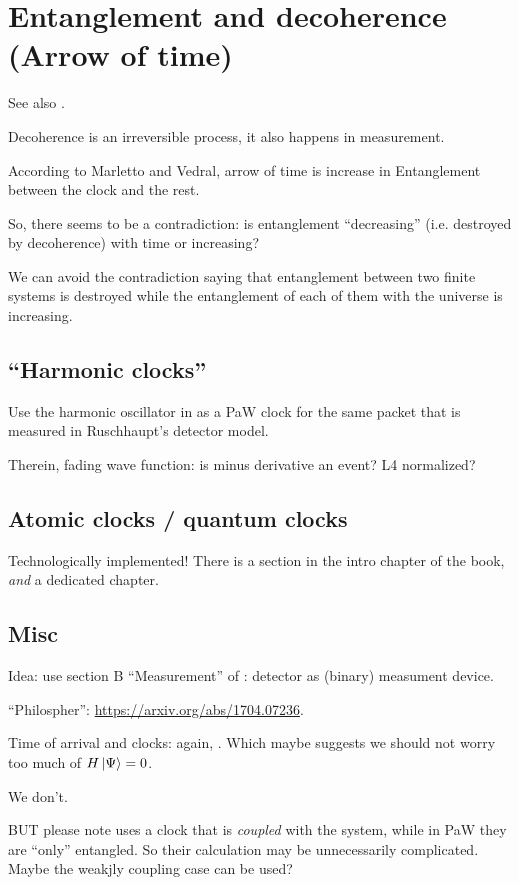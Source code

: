 \section{Entanglement and decoherence (Arrow of time)}
See also \cite{EntanglementVsDecoherence}.

Decoherence is an irreversible process, it also happens in measurement.

According to Marletto and Vedral, arrow of time is increase in Entanglement
between the clock and the rest.

So, there seems to be a contradiction: is entanglement ``decreasing''
(i.e. destroyed by decoherence) with time
or increasing?

We can avoid the contradiction saying that
entanglement between two finite systems is
destroyed while the entanglement of each of them with the universe
is increasing.

\subsection{``Harmonic clocks''}

Use the harmonic oscillator in \cite{HarmonicClocks}
as a PaW clock for the same packet that is measured in
Ruschhaupt's detector model.

Therein, fading wave function: is minus derivative an event?
L4 normalized?

\subsection{Atomic clocks / quantum clocks}
Technologically implemented! There is a section in the intro chapter of the book,
\emph{and} a dedicated chapter.

\subsection{Misc}

Idea: use section B ``Measurement'' of \cite{Lloyd:Time}: detector as (binary) measument device.

``Philospher'': \url{https://arxiv.org/abs/1704.07236}.

Time of arrival and clocks: again, \cite{YearsleyHalliwell_Clocks}.
Which maybe suggests we should not worry too much of $H\ket{\Psi} = 0$.

We don't.

BUT please note \cite{YearsleyHalliwell_Clocks} uses a clock that is
\emph{coupled} with the system, while in PaW they are ``only'' entangled.
So their calculation may be unnecessarily complicated.
Maybe the weakjly coupling case can be used?

